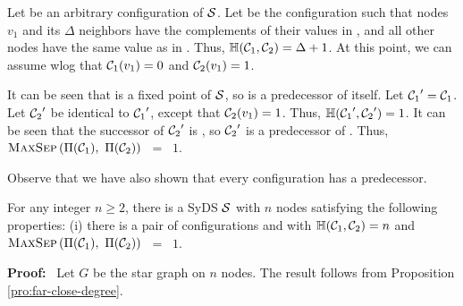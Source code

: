 Let \calcone{} be an arbitrary configuration of $\mbox{$\mathcal{S}$}${}.
Let \calctwo{} be the configuration such that nodes $v_1$ and its $\Delta$ neighbors
have the complements of their values in \calcone{},
and all other nodes have the same value as in \calcone{}.
Thus, $\mbox{$\mathbb{H}$}(\mbox{$\mathcal{C}_{1}$}, \mbox{$\mathcal{C}_{2}$}) = \Delta + 1$.
At this point, we can assume wlog that $\mbox{$\mathcal{C}_{1}$}(v_1) = 0$ and $\mbox{$\mathcal{C}_{2}$}(v_1) = 1$.


It can be seen that \calcone{} is a fixed point of $\mbox{$\mathcal{S}$}${},
so \calcone{} is a predecessor of itself.
Let $\mbox{$\mathcal{C}_{1}$}' = \mbox{$\mathcal{C}_{1}$}$.
Let $\mbox{$\mathcal{C}_{2}$}'$ be identical to $\mbox{$\mathcal{C}_{1}$}'{}$, except that $\mbox{$\mathcal{C}_{2}$}(v_1) = 1$.
Thus, $\mbox{$\mathbb{H}$}(\mbox{$\mathcal{C}_{1}$}', \mbox{$\mathcal{C}_{2}$}') =1$.
It can be seen that the successor of $\mbox{$\mathcal{C}_{2}$}'$ is \calctwo{},
so $\mbox{$\mathcal{C}_{2}$}'$ is a predecessor of \calctwo{}.
Thus, $\mbox{\textsc{MaxSep}}\left( \mbox{$\Pi(\mbox{$\mathcal{C}_{1}$})$},~ \mbox{$\Pi(\mbox{$\mathcal{C}_{2}$})$} \right)$ ~=~ $1$.

Observe that we have also shown that every configuration has a predecessor.
\QED



\smallskip

\begin{proposition}\label{pro:far-close}
For any integer $n \geq 2$,
there is a SyDS $\mbox{$\mathcal{S}$}${} with $n$
nodes satisfying the following properties: 
(i) there is a pair of configurations
\calcone{} and \calctwo{} with $\mbox{$\mathbb{H}$}(\mbox{$\mathcal{C}_{1}$}, \mbox{$\mathcal{C}_{2}$}) = n$  and 
$\mbox{\textsc{MaxSep}}\left( \mbox{$\Pi(\mbox{$\mathcal{C}_{1}$})$},~ \mbox{$\Pi(\mbox{$\mathcal{C}_{2}$})$} \right)$ ~=~ $1$.
\end{proposition}

\noindent
\textbf{Proof:}~ 
Let $G$ be the star graph on $n$ nodes.
The result follows from Proposition \ref{pro:far-close-degree}.
\QED



